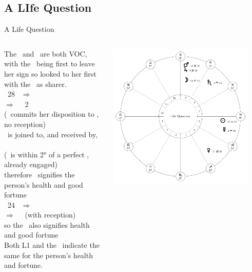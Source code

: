 \subsection{A LIfe Question}
\begin{frame}[t]{A Life Question}
\begin{columns}[T, onlytextwidth]
The \Sun\ and \Moon\ are both VOC, with the \Moon\ being first to leave her sign so looked to her first with the \Sun\ as sharer.\\
\vspace{0.25cm}
\Moon\ 28 \Aries\ $\Rightarrow$ \Taurus \\
$\Rightarrow$ \Square\ \Mercury\ 2 \Aquarius\ \\
\hspace{1em} (\Moon\ commits her disposition to \Mercury, no reception) \\
\Mercury\ is joined to, and received by, \Saturn\ \\
\hspace{1em}(\Mercury\ is within 2° of a perfect \Sextile, already engaged) \\
therefore \Saturn\ signifies the person's health and good fortune\\
\vspace{0.25cm}
\Sun\ 24 \Aquarius\ $\Rightarrow$ \Pisces \\
$\Rightarrow$ \Sextile\ \Jupiter\ (with reception) \\
so the \Sun\ also signifies health and good fortune \\
\vspace{0.25cm}
Both L1 and the \Moon\ indicate the same for the person's health and fortune.
\begin{center}
{\includegraphics[width=0.9\textwidth]{charts/22-chart-life}}
\end{center}
\end{columns}
\end{frame}
